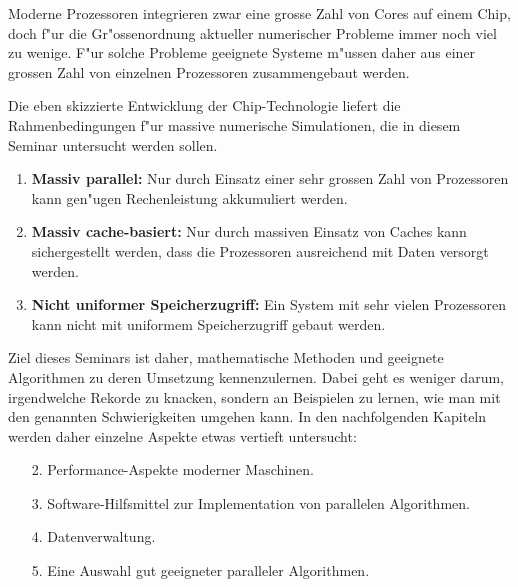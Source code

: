 Moderne Prozessoren integrieren zwar eine grosse Zahl von Cores auf
einem Chip, doch f"ur die Gr"ossenordnung aktueller numerischer
Probleme immer noch viel zu wenige. F"ur solche Probleme geeignete
Systeme m"ussen daher aus einer grossen Zahl von einzelnen Prozessoren
zusammengebaut werden. 

Die eben skizzierte Entwicklung der Chip-Technologie liefert die
Rahmenbedingungen f"ur massive numerische Simulationen, die in diesem
Seminar untersucht werden sollen.
\begin{enumerate}
\item {\bf Massiv parallel:} Nur durch Einsatz einer sehr grossen Zahl
von Prozessoren kann gen"ugen Rechenleistung akkumuliert werden.
\item {\bf Massiv cache-basiert:} Nur durch massiven Einsatz von
Caches kann sichergestellt werden, dass die Prozessoren ausreichend
mit Daten versorgt werden.
\item {\bf Nicht uniformer Speicherzugriff:} Ein System mit
sehr vielen Prozessoren kann nicht mit uniformem Speicherzugriff gebaut
werden.
\end{enumerate}
Ziel dieses Seminars ist daher, mathematische Methoden und geeignete
Algorithmen zu deren Umsetzung kennenzulernen. Dabei geht es weniger
darum, irgendwelche Rekorde zu knacken, sondern an Beispielen zu
lernen, wie man mit den genannten Schwierigkeiten umgehen kann.
In den nachfolgenden Kapiteln werden daher einzelne Aspekte etwas
vertieft untersucht:
\begin{enumerate}
\item[2.] Performance-Aspekte moderner Maschinen.
\item[3.] Software-Hilfsmittel zur Implementation von parallelen Algorithmen.
\item[4.] Datenverwaltung.
\item[5.] Eine Auswahl gut geeigneter paralleler Algorithmen.
\end{enumerate}
